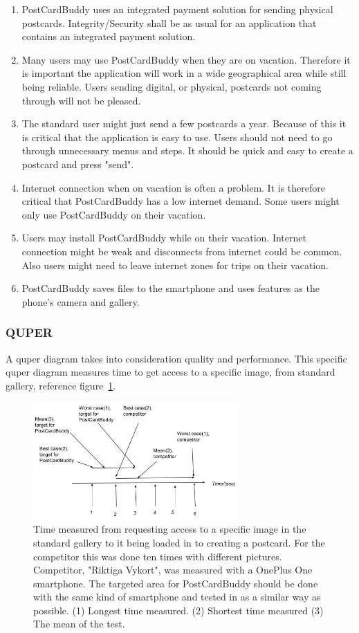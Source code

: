 \documentclass[10pt,a4paper]{article}
\begin{document}
\begin{enumerate}
\item PostCardBuddy uses an integrated payment solution for sending physical postcards. Integrity/Security shall be as usual for an application that contains an integrated payment solution.
\item Many users may use PostCardBuddy when they are on vacation. Therefore it is important the application will work in a wide geographical area while still being reliable. Users sending digital, or physical, postcards not coming through will not be pleased.
\item The standard user might just send a few postcards a year. Because of this it is critical that the application is easy to use. Users should not need to go through unnecessary menus and steps. It should be quick and easy to create a postcard and press "send".
\item Internet connection when on vacation is often a problem. It is therefore critical that PostCardBuddy has a low internet demand. Some users might only use PostCardBuddy on their vacation.
\item Users may install PostCardBuddy while on their vacation. Internet connection might be weak and disconnects from internet could be common. Also users might need to leave internet zones for trips on their vacation.
\item PostCardBuddy saves files to the smartphone and uses features as the phone's camera and gallery.
\end{enumerate}

\subsubsection{QUPER}
A quper diagram takes into consideration quality and performance. This specific quper diagram measures time to get access to a specific image, from standard gallery, reference figure~\ref{fig:quper}.


\begin{figure}[h!]
\centering
\includegraphics[width=0.7\textwidth]{QUPER_v1.jpg}
\caption{Time measured from requesting access to a specific image in the standard gallery to it being loaded in to creating a postcard. For the competitor this was done ten times with different pictures. 
Competitor, "Riktiga Vykort", was measured with a OnePlus One smartphone. The targeted area for PostCardBuddy should be done with the same kind of smartphone and tested in as a similar way as possible.\newline
(1) Longest time measured. (2) Shortest time measured (3) The mean of the test. }
\label{fig:quper}
\end{figure}
\end{document}
